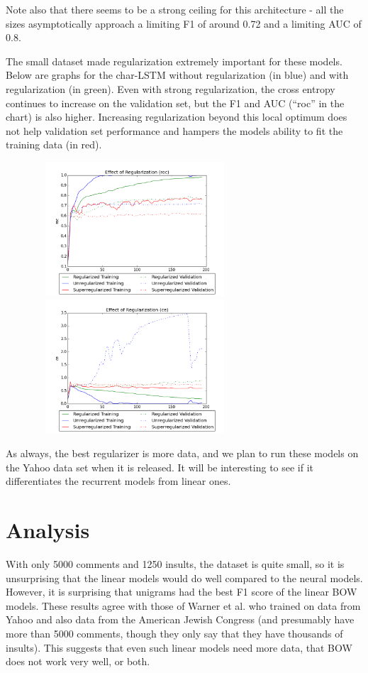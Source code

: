 \documentclass{article} %
\begin{document}
\vspace*{-0.8cm}
Note also that there seems to be a strong ceiling for this architecture - all the sizes asymptotically approach a limiting F1 of around 0.72 and a limiting AUC of 0.8.

The small dataset made regularization extremely important for these models. Below are graphs for the char-LSTM without regularization (in blue) and with regularization (in green). Even with strong regularization, the cross entropy continues to increase on the validation set, but the F1 and AUC (``roc'' in the chart) is also higher. Increasing regularization beyond this local optimum does not help validation set performance and hampers the models ability to fit the training data (in red).

\begin{figure}[H]
\label{effect-regularization}
\hspace*{-0.5cm}
\includegraphics[width=7.5cm, height=5cm]{roc_train_v_valid_Effect_of_Regularization.png}
\hspace*{-0.0cm}
\includegraphics[width=7.5cm, height=5cm]{ce_train_v_valid_Effect_of_Regularization.png}
\end{figure}

As always, the best regularizer is more data, and we plan to run these models on the Yahoo data set when it is released. It will be interesting to see if it differentiates the recurrent models from linear ones. 

\section*{Analysis}
With only 5000 comments and 1250 insults, the dataset is quite small, so it is unsurprising that the linear models would do well compared to the neural models. However, it is surprising that unigrams had the best F1 score of the linear BOW models. These results agree with those of Warner et al. \cite{warner2012detecting} who trained on data from Yahoo and also data from the American Jewish Congress (and presumably have more than 5000 comments, though they only say that they have thousands of insults). This suggests that even such linear models need more data, that BOW does not work very well, or both.
\end{document}
